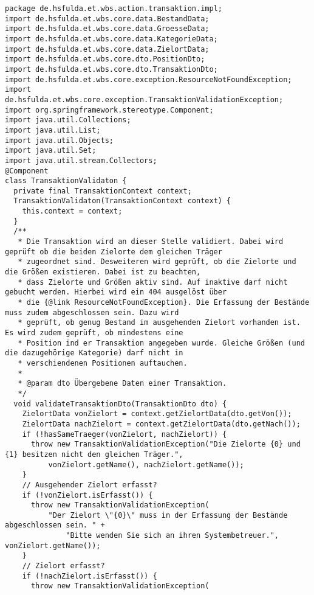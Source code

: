 \begin{lstlisting}[caption={Validierung der übergebenen Daten einer Transaktion.}, label={lst:TransaktionValidaton}]
package de.hsfulda.et.wbs.action.transaktion.impl;
import de.hsfulda.et.wbs.core.data.BestandData;
import de.hsfulda.et.wbs.core.data.GroesseData;
import de.hsfulda.et.wbs.core.data.KategorieData;
import de.hsfulda.et.wbs.core.data.ZielortData;
import de.hsfulda.et.wbs.core.dto.PositionDto;
import de.hsfulda.et.wbs.core.dto.TransaktionDto;
import de.hsfulda.et.wbs.core.exception.ResourceNotFoundException;
import de.hsfulda.et.wbs.core.exception.TransaktionValidationException;
import org.springframework.stereotype.Component;
import java.util.Collections;
import java.util.List;
import java.util.Objects;
import java.util.Set;
import java.util.stream.Collectors;
@Component
class TransaktionValidaton {
  private final TransaktionContext context;
  TransaktionValidaton(TransaktionContext context) {
    this.context = context;
  }
  /**
   * Die Transaktion wird an dieser Stelle validiert. Dabei wird geprüft ob die beiden Zielorte dem gleichen Träger
   * zugeordnet sind. Desweiteren wird geprüft, ob die Zielorte und die Größen existieren. Dabei ist zu beachten,
   * dass Zielorte und Größen aktiv sind. Auf inaktive darf nicht gebucht werden. Hierbei wird ein 404 ausgelöst über
   * die {@link ResourceNotFoundException}. Die Erfassung der Bestände muss zudem abgeschlossen sein. Dazu wird
   * geprüft, ob genug Bestand im ausgehenden Zielort vorhanden ist. Es wird zudem geprüft, ob mindestens eine
   * Position ind er Transaktion angegeben wurde. Gleiche Größen (und die dazugehörige Kategorie) darf nicht in
   * verschiendenen Positionen auftauchen.
   *
   * @param dto Übergebene Daten einer Transaktion.
   */
  void validateTransaktionDto(TransaktionDto dto) {
    ZielortData vonZielort = context.getZielortData(dto.getVon());
    ZielortData nachZielort = context.getZielortData(dto.getNach());
    if (!hasSameTraeger(vonZielort, nachZielort)) {
      throw new TransaktionValidationException("Die Zielorte {0} und {1} besitzen nicht den gleichen Träger.",
          vonZielort.getName(), nachZielort.getName());
    }
    // Ausgehender Zielort erfasst?
    if (!vonZielort.isErfasst()) {
      throw new TransaktionValidationException(
          "Der Zielort \"{0}\" muss in der Erfassung der Bestände abgeschlossen sein. " +
              "Bitte wenden Sie sich an ihren Systembetreuer.", vonZielort.getName());
    }
    // Zielort erfasst?
    if (!nachZielort.isErfasst()) {
      throw new TransaktionValidationException(

\end{lstlisting}
